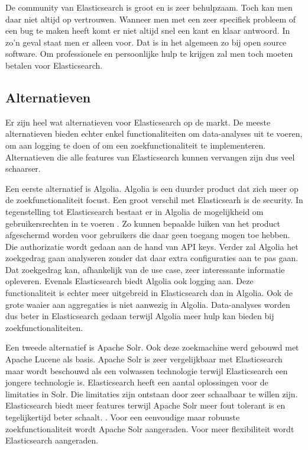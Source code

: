 De community van Elasticsearch is groot en is zeer behulpzaam. Toch kan men daar niet altijd op vertrouwen. Wanneer men met een zeer specifiek probleem of een bug te maken heeft komt er niet altijd snel een kant en klaar antwoord. In zo'n geval staat men er alleen voor. Dat is in het algemeen zo bij open source software. Om professionele en persoonlijke hulp te krijgen zal men toch moeten betalen voor Elasticsearch.

\subsection{Alternatieven}

Er zijn heel wat alternatieven voor Elasticsearch op de markt. De meeste alternatieven bieden echter enkel functionaliteiten om data-analyses uit te voeren, om aan logging te doen of om een zoekfunctionaliteit te implementeren. Alternatieven die alle features van Elasticsearch kunnen vervangen zijn dus veel schaarser. 

Een eerste alternatief is Algolia. Algolia is een duurder product dat zich meer op de zoekfunctionaliteit focust. Een groot verschil met Elasticsearh is de security. In tegenstelling tot Elasticsearch bestaat er in Algolia de mogelijkheid om gebruikersrechten in te voeren \autocite{Algolia}. Zo kunnen bepaalde luiken van het product afgeschermd worden voor gebruikers die daar geen toegang mogen toe hebben. Die authorizatie wordt gedaan aan de hand van API keys. Verder zal Algolia het zoekgedrag gaan analyseren zonder dat daar extra configuraties aan te pas gaan. Dat zoekgedrag kan, afhankelijk van de use case, zeer interessante informatie opleveren. Evenals Elasticsearch biedt Algolia ook logging aan. Deze functionaliteit is echter meer uitgebreid in Elasticsearch dan in Algolia. Ook de grote waaier aan aggregaties is niet aanwezig in Algolia. Data-analyses worden dus beter in Elasticsearch gedaan terwijl Algolia meer hulp kan bieden bij zoekfunctionaliteiten.

Een tweede alternatief is Apache Solr. Ook deze zoekmachine werd gebouwd met Apache Lucene als basis. Apache Solr is zeer vergelijkbaar met Elasticsearch maar wordt beschouwd als een volwassen technologie terwijl Elasticsearch een jongere technologie is. Elasticsearch heeft een aantal oplossingen voor de limitaties in Solr. Die limitaties zijn ontstaan door zeer schaalbaar te willen zijn. Elasticsearch biedt meer features terwijl Apache Solr meer fout tolerant is en tegelijkertijd beter schaalt. \autocite{Solr}. Voor een eenvoudige maar robuuste zoekfunctionaliteit wordt Apache Solr aangeraden. Voor meer flexibiliteit wordt Elasticsearch aangeraden.


